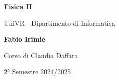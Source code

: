 \begin{titlepage}
	\begin{center}
		\vspace*{1cm}

		\Huge
		\textbf{Fisica II}

		\vspace{0.5cm}
		\LARGE
		UniVR - Dipartimento di Informatica

		\vspace{1.5cm}

		\textbf{Fabio Irimie}

		\vfill


		\vspace{0.8cm}

    Corso di Claudia Daffara

		2° Semestre 2024/2025

	\end{center}
\end{titlepage}
